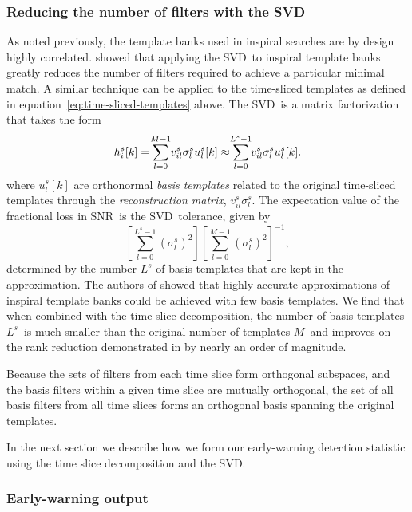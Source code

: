 \documentclass[preprint2]{aastex}
\newcommand{\SNR}{SNR}%
\newcommand{\numtmps}{\ensuremath{M}}
\newcommand{\SVD}{SVD}%
\newcommand{\svdtmps}[1]{\ensuremath{L^#1}}
\newcommand{\numsvdtmps}{\svdtmps{s}}
\def\clap#1{\hbox to 0pt{\hss#1\hss}}
\def\mathclap{\mathpalette\mathclapinternal}
\def\mathclapinternal#1#2{\clap{$\mathsurround=0pt#1{#2}$}}
\begin{document}
\subsubsection{Reducing the number of filters with the \SVD}
\label{sec:svd}

As noted previously, the template banks used in inspiral searches are by design
highly correlated.  \citet{Cannon:2010p10398} showed that applying the \SVD\
to inspiral template banks greatly reduces the number of filters required to achieve a
particular minimal match.  A similar technique can be applied to the time-sliced
templates as defined in equation~\ref{eq:time-sliced-templates} above.  The \SVD\
is a matrix factorization that takes the form
%
\begin{equation}
h_i^s[k] = \sum_{\mathclap{l=0}}^{\mathclap{M-1}} v_{il}^s \sigma_l^s u_l^s[k] \approx \sum_{\mathclap{l=0}}^{\mathclap{L^s-1}} v_{il}^s \sigma_l^s u_l^s[k].
\label{eq:svddecomp}
\end{equation}
where $u_l^s[k]$ are orthonormal \emph{basis templates} related to the original
time-sliced templates through the \emph{reconstruction matrix}, $v_{il}^s\sigma_l^s$.
The expectation value of the fractional loss in \SNR\ is the \SVD\ tolerance, given by
%
\begin{equation*}
\left[ \sum_{l=0}^{L^s-1} \left( \sigma_l^s \right)^2 \right]\left[ \sum_{l=0}^{M-1} \left( \sigma_l^s \right)^2 \right]^{-1},
\end{equation*}
%
determined by the number $\numsvdtmps$ of basis templates that are kept in
the approximation.  The authors of \citet{Cannon:2010p10398}
showed that highly accurate approximations of inspiral template banks could be
achieved with few basis templates.  We find that when combined with the
time slice decomposition, the number of basis templates \numsvdtmps\ is much
smaller than the original number of templates \numtmps\ and improves on the
rank reduction demonstrated in \citep{Cannon:2010p10398} by nearly an order
of magnitude.

Because the sets of filters from each time slice form orthogonal subspaces, and
the basis filters within a given time slice are mutually orthogonal, the set of
all basis filters from all time slices forms an orthogonal basis spanning the
original templates.

In the next section we describe how we form our early-warning detection
statistic using the time slice decomposition and the \SVD.

\subsubsection{Early-warning output}
\end{document}
